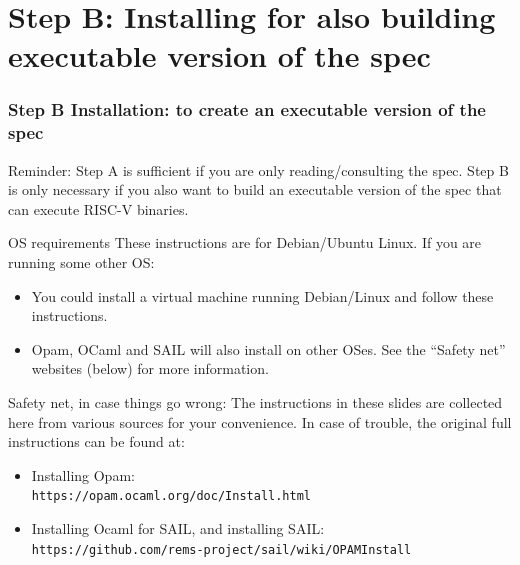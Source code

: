 \documentclass[aspectratio=169]{beamer}
\newcommand{\hm}{\hspace*{1em}}
\newcommand{\scripttt}{\scriptsize\tt}
\begin{document}

\section{Step B: Installing for also building executable version of the spec}

\begin{frame}
  \frametitle{Step B Installation: to create an executable version of the spec}

  {\scriptsize Reminder: Step A is sufficient if you are only
    reading/consulting the spec.  Step B is only necessary if you also
    want to build an executable version of the spec that can execute
    RISC-V binaries.}

  \begin{block}{OS requirements}
    \scriptsize
    These instructions are for Debian/Ubuntu Linux.  If you are running some other OS:
    \begin{itemize}
      \item You could install a virtual machine running Debian/Linux and follow these instructions.


      \item Opam, OCaml and SAIL will also install on other OSes.  See the ``Safety
        net'' websites (below) for more information.

    \end{itemize}
  \end{block}

  \begin{block}{Safety net, in case things go wrong:}
    \scriptsize
    The instructions in these slides are collected here from various
    sources for your convenience. In case of trouble, the original
    full instructions can be found at:

    \begin{itemize}

      \item Installing Opam: \\
        {\scripttt\hm https://opam.ocaml.org/doc/Install.html}

      \item Installing Ocaml for SAIL, and installing SAIL: \\
        {\scripttt\hm https://github.com/rems-project/sail/wiki/OPAMInstall}

    \end{itemize}
  \end{block}

\end{frame}
\end{document}
